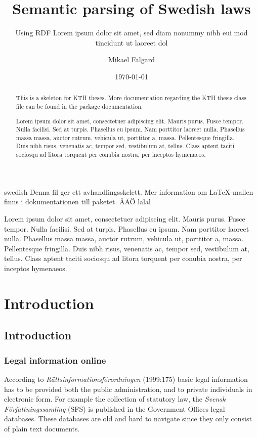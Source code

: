 \documentclass[a4paper,11pt]{kth-mag}
\title{Semantic parsing of Swedish laws}
\subtitle{Using RDF Lorem ipsum dolor sit amet, sed diam nonummy nibh eui
              mod tincidunt ut laoreet dol}
\author{Mikael Falgard}
\date{\today}
\begin{document}
\frontmatter
\pagestyle{empty}
\removepagenumbers
\maketitle
{}
\begin{abstract}
  This is a skeleton for KTH theses. More documentation
  regarding the KTH thesis class file can be found in
  the package documentation.

Lorem ipsum dolor sit amet, consectetuer adipiscing elit. Mauris
purus. Fusce tempor. Nulla facilisi. Sed at turpis. Phasellus eu
ipsum. Nam porttitor laoreet nulla. Phasellus massa massa, auctor
rutrum, vehicula ut, porttitor a, massa. Pellentesque fringilla. Duis
nibh risus, venenatis ac, tempor sed, vestibulum at, tellus. Class
aptent taciti sociosqu ad litora torquent per conubia nostra, per
inceptos hymenaeos.
\end{abstract}
\clearpage
\begin{foreignabstract}{swedish}
  Denna fil ger ett avhandlingsskelett.
  Mer information om \LaTeX-mallen finns i
  dokumentationen till paketet. ÅÄÖ lalal

Lorem ipsum dolor sit amet, consectetuer adipiscing elit. Mauris
purus. Fusce tempor. Nulla facilisi. Sed at turpis. Phasellus eu
ipsum. Nam porttitor laoreet nulla. Phasellus massa massa, auctor
rutrum, vehicula ut, porttitor a, massa. Pellentesque fringilla. Duis
nibh risus, venenatis ac, tempor sed, vestibulum at, tellus. Class
aptent taciti sociosqu ad litora torquent per conubia nostra, per
inceptos hymenaeos.
\end{foreignabstract}
\clearpage
\tableofcontents*
\mainmatter
\pagestyle{newchap}

\part{Introduction}
\chapter{Introduction}

\section{Legal information online}

According to \textit{Rättsinformationsförordningen} (1999:175) basic legal information has to be provided both the public administration, and to private individuals in electronic form. For example the collection of statutory law, the \textit{Svensk Författningssamling} (SFS) is published in the Government Offices legal databases. These databases are old and hard to navigate since they only consist of plain text documents.
\end{document}
